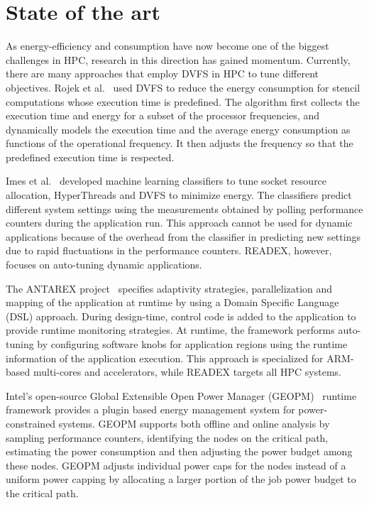 \section{State of the art} \label{sec:related-work}
As energy-efficiency and consumption have now become one of the biggest challenges in HPC, research in this direction has gained momentum. Currently, there are many approaches that employ DVFS in HPC to tune different objectives. Rojek et al.~\cite{Rojek} used DVFS to reduce the energy consumption for stencil computations whose execution time is predefined. The algorithm first collects the execution time and energy for a subset of the processor frequencies, and dynamically models the execution time and the average energy consumption as functions of the operational frequency. It then adjusts the frequency so that the predefined execution time is respected.

Imes et al.~\cite{Imes} developed machine learning classifiers to tune socket resource allocation, HyperThreads and DVFS to minimize energy. The classifiers predict different system settings using the measurements obtained by polling performance counters during the application run. This approach cannot be used for dynamic applications because of the overhead from the classifier in predicting new settings due to rapid fluctuations in the performance counters. READEX, however, focuses on auto-tuning dynamic applications.
	
The ANTAREX project~\cite{silvano2016antarex} specifies adaptivity strategies, parallelization and mapping of the application at runtime by using a Domain Specific Language (DSL) approach. During design-time, control code is added to the application to provide runtime monitoring strategies. At runtime, the framework performs auto-tuning by configuring software knobs for application regions using the runtime information of the application execution. This approach is specialized for ARM-based multi-cores and accelerators, while READEX targets all HPC systems.

Intel's open-source Global Extensible Open Power Manager (GEOPM)~\cite{geopm} runtime framework provides a plugin based energy management system for power-constrained systems. GEOPM supports both offline and online analysis by sampling performance counters, identifying the nodes on the critical path, estimating the power consumption and then adjusting the power budget among these nodes. GEOPM adjusts individual power caps for the nodes instead of a uniform power capping by allocating a larger portion of the job power budget to the critical path. 
	
